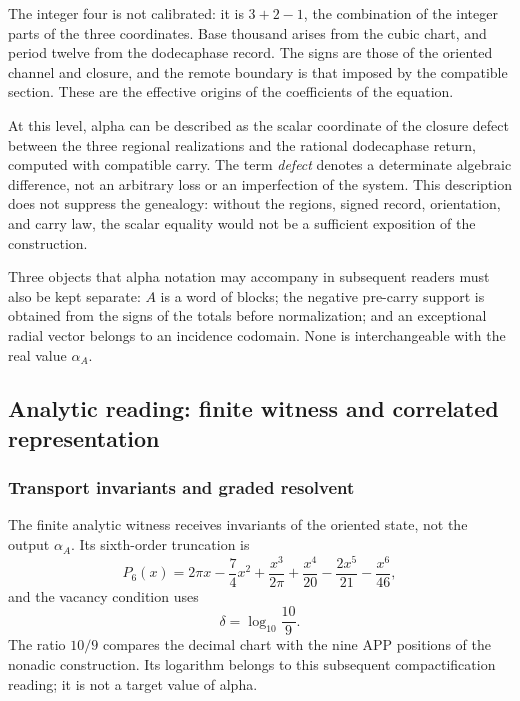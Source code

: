 The integer four is not calibrated: it is
\(3+2-1\), the combination of the integer parts of the three coordinates.
Base thousand arises from the cubic chart, and period twelve from the dodecaphase record.
The signs are those of the oriented channel and closure, and the remote boundary is
that imposed by the compatible section. These are the effective origins of
the coefficients of the equation.

At this level, alpha can be described as the scalar coordinate of the
closure defect between the three regional realizations and the
rational dodecaphase return, computed with compatible carry. The term
\emph{defect} denotes a determinate algebraic difference, not an
arbitrary loss or an imperfection of the system. This description does not
suppress the genealogy: without the regions, signed record,
orientation, and carry law, the scalar equality would not be a
sufficient exposition of the construction.

Three objects that alpha notation may accompany in subsequent readers
must also be kept separate: \(A\) is a word of
blocks; the negative pre-carry support is obtained from the signs of the
totals before normalization; and an exceptional radial vector belongs to
an incidence codomain. None is interchangeable with the
real value \(\alpha_A\).






\subsection{Analytic reading: finite witness and correlated representation}
\subsubsection{Transport invariants and graded resolvent}
\label{subsec:alpha-via-b}

The finite analytic witness receives invariants of the oriented state, not the
output \(\alpha_A\). Its sixth-order truncation is
\begin{equation}
 P_6(x)=2\pi x-\frac74x^2
 +\frac{x^3}{2\pi}
 +\frac{x^4}{20}-\frac{2x^5}{21}-\frac{x^6}{46},
 \label{eq:alpha-p6}
\end{equation}
and the vacancy condition uses
\[
 \delta=\log_{10}\frac{10}{9}.
\]
The ratio \(10/9\) compares the decimal chart with the nine APP
positions of the nonadic construction. Its logarithm belongs to this subsequent
compactification reading; it is not a target value of alpha.

